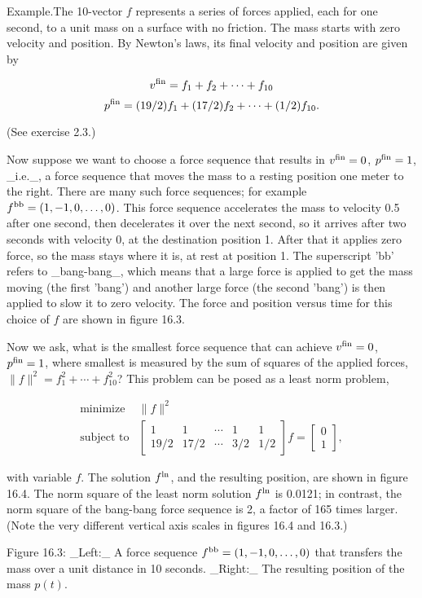 Example.The 10-vector \(f\) represents a series of forces applied, each for one second, to a unit mass on a surface with no friction. The mass starts with zero velocity and position. By Newton's laws, its final velocity and position are given by

\[v^{\rm fin} = f_{1}+f_{2}+\cdots+f_{10}\] \[p^{\rm fin} = (19/2)f_{1}+(17/2)f_{2}+\cdots+(1/2)f_{10}.\]

(See exercise 2.3.)

Now suppose we want to choose a force sequence that results in \(v^{\rm fin}=0\), \(p^{\rm fin}=1\), _i.e._, a force sequence that moves the mass to a resting position one meter to the right. There are many such force sequences; for example \(f^{\rm bb}=(1,-1,0,\ldots,0)\). This force sequence accelerates the mass to velocity 0.5 after one second, then decelerates it over the next second, so it arrives after two seconds with velocity 0, at the destination position 1. After that it applies zero force, so the mass stays where it is, at rest at position 1. The superscript 'bb' refers to _bang-bang_, which means that a large force is applied to get the mass moving (the first 'bang') and another large force (the second 'bang') is then applied to slow it to zero velocity. The force and position versus time for this choice of \(f\) are shown in figure 16.3.

Now we ask, what is the smallest force sequence that can achieve \(v^{\rm fin}=0\), \(p^{\rm fin}=1\), where smallest is measured by the sum of squares of the applied forces, \(\|f\|^{2}=f_{1}^{2}+\cdots+f_{10}^{2}\)? This problem can be posed as a least norm problem,

\[\begin{array}{ll}\mbox{minimize}&\|f\|^{2}\\ \mbox{subject to}&\left[\begin{array}{ccccc}1&1&\cdots&1&1\\ 19/2&17/2&\cdots&3/2&1/2\end{array}\right]f=\left[\begin{array}{c}0\\ 1\end{array}\right],\end{array}\]

with variable \(f\). The solution \(f^{\rm ln}\), and the resulting position, are shown in figure 16.4. The norm square of the least norm solution \(f^{\rm ln}\) is 0.0121; in contrast, the norm square of the bang-bang force sequence is 2, a factor of 165 times larger. (Note the very different vertical axis scales in figures 16.4 and 16.3.)

Figure 16.3: _Left:_ A force sequence \(f^{\rm bb}=(1,-1,0,\ldots,0)\) that transfers the mass over a unit distance in 10 seconds. _Right:_ The resulting position of the mass \(p(t)\).

 